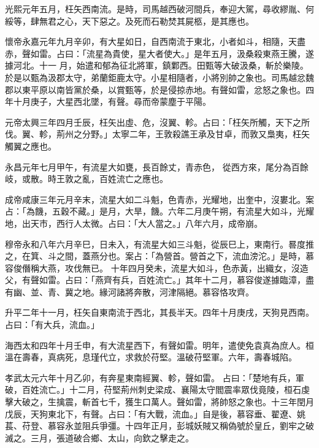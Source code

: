 \begin{pinyinscope}
 光熙元年五月，枉矢西南流。是時，司馬越西破河間兵，奉迎大駕，尋收繆胤、何綏等，肆無君之心，天下惡之。及死而石勒焚其屍柩，是其應也。



 懷帝永嘉元年九月辛卯，有大星如日，自西南流于東北，小者如斗，相隨，天盡赤，聲如雷。占曰：「流星為貴使，星大者使大。」是年五月，汲桑殺東燕王騰，遂據河北。十一
 月，始遣和郁為征北將軍，鎮鄴西。田甄等大破汲桑，斬於樂陵。於是以甄為汲郡太守，弟蘭鉅鹿太守。小星相隨者，小將別帥之象也。司馬越忿魏郡以東平原以南皆黨於桑，以賞甄等，於是侵掠赤地。有聲如雷，忿怒之象也。四年十月庚子，大星西北墜，有聲。尋而帝蒙塵于平陽。



 元帝太興三年四月壬辰，枉矢出虛、危，沒翼、軫。占曰：「枉矢所觸，天下之所伐。翼、軫，荊州之分野。」太寧二年，王敦殺譙王承及甘卓，而敦又梟夷，枉矢觸翼之應也。



 永昌元年七月甲午，有流星大如甕，長百餘丈，青赤色，
 從西方來，尾分為百餘岐，或散。時王敦之亂，百姓流亡之應也。



 成帝咸康三年元月辛末，流星大如二斗魁，色青赤，光耀地，出奎中，沒婁北。案占：「為饑，五穀不藏。」是月，大旱，饑。六年二月庚午朔，有流星大如斗，光耀地，出天市，西行人太微。占曰：「大人當之。」八年六月，成帝崩。



 穆帝永和八年六月辛巳，日未入，有流星大如三斗魁，從辰巳上，東南行。晷度推之，在箕、斗之間，蓋燕分也。案占：「為營首。營首之下，流血滂沱。」是時，慕容俊僭稱大燕，攻伐無已。
 十年四月癸未，流星大如斗，色赤黃，出織女，沒造父，有聲如雷。占曰：「燕齊有兵，百姓流亡。」其年十二月，慕容俊遂據臨漳，盡有幽、並、青、冀之地。緣河諸將奔散，河津隔絕。慕容恪攻齊。



 升平二年十一月，枉矢自東南流于西北，其長半天。四年十月庚戌，天狗見西南。占曰：「有大兵，流血。」



 海西太和四年十月壬申，有大流星西下，有聲如雷。明年，遣使免袁真為庶人。桓溫在壽春，真病死，息瑾代立，求救於苻堅。溫破苻堅軍。六年，壽春城陷。



 孝武太元六年十月乙卯，有奔星東南經翼、軫，聲如雷。
 占曰：「楚地有兵，軍破，百姓流亡。」十二月，苻堅荊州刺史梁成、襄陽太守閻震率眾伐竟陵，桓石虔擊大破之，生擒震，斬首七千，獲生口萬人。聲如雷，將帥怒之象也。十三年閏月戊辰，天狗東北下，有聲。占曰：「有大戰，流血。」自是後，慕容垂、翟遼、姚萇、苻登、慕容永並阻兵爭彊。十四年正月，彭城妖賊又稱偽號於皇丘，劉牢之破滅之。三月，張道破合鄉、太山，向欽之擊走之。




\end{pinyinscope}
